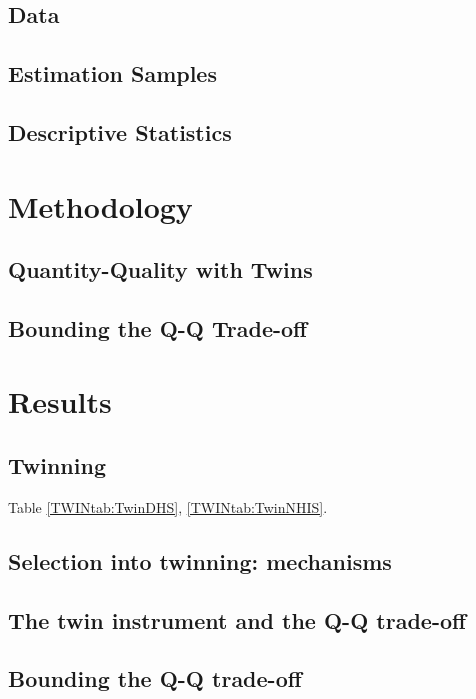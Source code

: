 \documentclass{article}[11pt,subeqn]
\begin{document}
\begin{spacing}{1.4}
\subsection{Data}                                  \label{TWINsscn:data}
\subsection{Estimation Samples}                    \label{TWINsscn:samples}
\subsection{Descriptive Statistics}                \label{TWINsscn:descriptives}
\section{Methodology}                              \label{TWINscn:method}
\subsection{Quantity-Quality with Twins}           \label{TWINsscn:methodQQ}
\subsection{Bounding the Q-Q Trade-off}            \label{TWINsscn:methodBounds}
\section{Results}                                  \label{TWINscn:results}
\subsection{Twinning}                              \label{TWINsscn:twinning}
Table \ref{TWINtab:TwinDHS}, \ref{TWINtab:TwinNHIS}.

\subsection{Selection into twinning: mechanisms}   \label{TWINsscn:selection}


\subsection{The twin instrument and the Q-Q trade-off} \label{TWINsscn:QQtwins}
\subsection{Bounding the Q-Q trade-off}            \label{TWINsscn:resultBounds}




\end{spacing}
\end{document}
